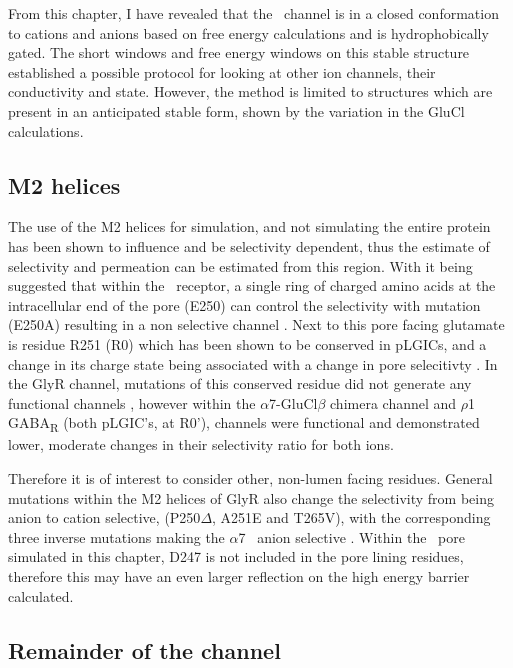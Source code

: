 From this chapter, I have revealed that the \HT\ channel is in a closed conformation to cations and anions based on free energy calculations and is hydrophobically gated. The short windows and free energy windows on this stable structure established a possible protocol for looking at other ion channels, their conductivity and state. However, the method is limited to structures which are present in an anticipated stable form, shown by the variation in the GluCl calculations. 

\subsection*{M2 helices}

The use of the M2 helices for simulation, and not simulating the entire protein has been shown to influence and be selectivity dependent, thus the estimate of selectivity and permeation can be estimated from this region. With it being suggested that within the \HT\ receptor, a single ring of charged amino acids at the intracellular end of the pore (E250) can control the selectivity with mutation (E250A) resulting in a non selective channel \cite{Thompson2003}. Next to this pore facing glutamate is residue R251 (R0\textquotesingle) which has been shown to be conserved in pLGICs, and a change in its charge state being associated with a change in pore selecitivty \cite{Cymes2011b}. In the GlyR channel, mutations of this conserved residue did not generate any functional channels \cite{Lynch1997}, however within the $\alpha$7-GluCl$\beta$ chimera channel \cite{Sunesen2006} and $\rho$1 GABA\textsubscript{R} \cite{Cheng2007a} (both pLGIC's, at R0'), channels were functional and demonstrated lower, moderate changes in their selectivity ratio for both ions. 

Therefore it is of interest to consider other, non-lumen facing residues. General mutations within the M2 helices of GlyR also change the selectivity from being anion to cation selective, (P250$\Delta$, A251E and T265V), with the corresponding three inverse mutations making the $\alpha$7 \na\ anion selective \cite{Keramidas2000}. Within the \HT\ pore simulated in this chapter, D247 is not included in the pore lining residues, therefore this may have an even larger reflection on the high energy barrier calculated.

\subsection*{Remainder of the channel}

